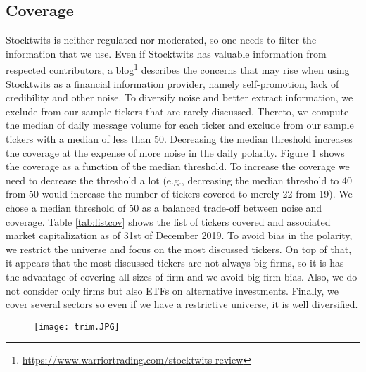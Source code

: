 \newpage 

\subsection{Coverage}

Stocktwits is neither regulated nor moderated, so one needs to filter the information that we use. Even if Stocktwits has valuable information from respected contributors, a blog\footnote{\url{https://www.warriortrading.com/stocktwits-review}} describes the concerns that may rise when using Stocktwits as a financial information provider, namely self-promotion, lack of credibility and other noise. To diversify noise and better extract information, we exclude from our sample tickers that are rarely discussed. Thereto, we compute the median of daily message volume for each ticker and exclude from our sample tickers with a median of less than 50. Decreasing the median threshold increases the coverage at the expense of more noise in the daily polarity. Figure \ref{fig:coverage} shows the coverage as a function of the median threshold. To increase the coverage we need to decrease the threshold a lot (e.g., decreasing the median threshold to 40 from 50 would increase the number of tickers covered to merely 22 from 19). We chose a median threshold of 50 as a balanced trade-off between noise and coverage. Table \ref{tab:listcov} shows the list of tickers covered and associated market capitalization as of 31st of December 2019. To avoid bias in the polarity, we restrict the universe and focus on the most discussed tickers. On top of that, it appears that the most discussed tickers are not always big firms, so it is has the advantage of covering all sizes of firm and we avoid big-firm bias. Also, we do not consider only firms but also ETFs on alternative investments. Finally, we cover several sectors so even if we have a restrictive universe, it is well diversified.

\begin{figure}[h]
    \centering
    \texttt{[image: trim.JPG]}
    \label{fig:coverage}
\end{figure}


